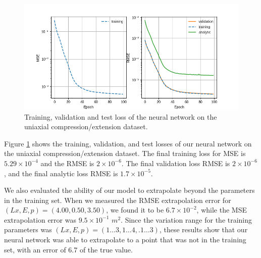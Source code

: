 \documentclass[oneside,a4paper,english,links]{amca}
\begin{document}
\begin{figure}[htpb!]
	\centering
	\includegraphics[width=1\textwidth]{Figures/Example1_losses.png}
	\caption{Training, validation and test loss of the neural network on the uniaxial compression/extension dataset.}
	\label{fig:train_loss}
	\end{figure}
 
Figure \ref{fig:train_loss} shows the training, validation, and test losses of our neural network on the uniaxial compression/extension dataset. The final training loss for MSE is $5.29\times10^{-4}$ and the RMSE is $2\times10^{-6}$. The final validation loss RMSE is $2\times10^{-6}$, and the final analytic loss RMSE is $1.7\times10^{-5}$.


We also evaluated the ability of our model to extrapolate beyond the parameters in the training set. When we measured the RMSE extrapolation error for $(Lx, E, p) = (4.00, 0.50, 3.50)$, we found it to be $6.7\times10^{-2}$, while the MSE extrapolation error was $9.5\times10^{-1}$ $m^2$. Since the variation range for the training parameters was $(Lx, E, p) = (1 \hdots 3, 1 \hdots 4, .1 \hdots 3)$, these results show that our neural network was able to extrapolate to a point that was not in the training set, with an error of 6.7 of the true value.
\end{document}
